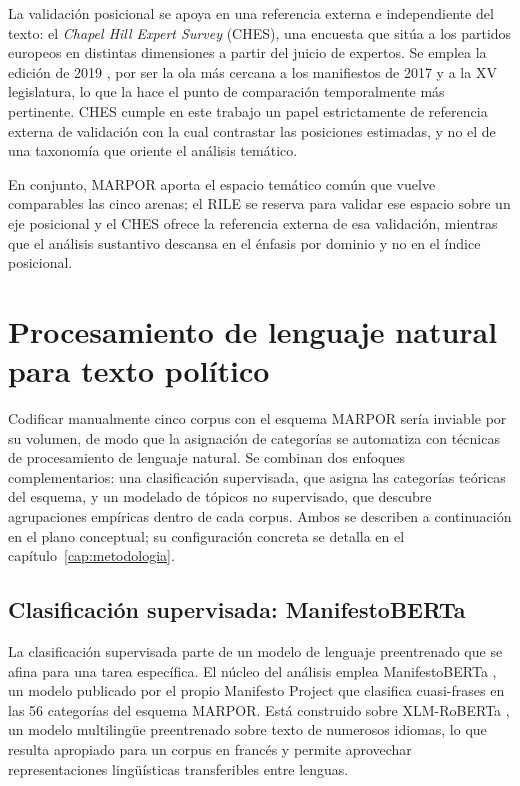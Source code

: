 La validación posicional se apoya en una referencia externa e independiente del
texto: el \emph{Chapel Hill Expert Survey} (CHES), una encuesta que sitúa a los
partidos europeos en distintas dimensiones a partir del juicio de expertos. Se
emplea la edición de 2019 \cite{jolly2022ches, ches2019data}, por ser la ola más
cercana a los manifiestos de 2017 y a la XV legislatura, lo que la hace el punto
de comparación temporalmente más pertinente. CHES cumple en este trabajo un papel
estrictamente de referencia externa de validación con la cual contrastar las
posiciones estimadas, y no el de una taxonomía que oriente el análisis temático.

En conjunto, MARPOR aporta el espacio temático común que vuelve comparables las
cinco arenas; el RILE se reserva para validar ese espacio sobre un eje posicional
y el CHES ofrece la referencia externa de esa validación, mientras que el análisis
sustantivo descansa en el énfasis por dominio y no en el índice posicional.

\section{Procesamiento de lenguaje natural para texto político}
\label{sec:nlp-politico}

Codificar manualmente cinco corpus con el esquema MARPOR sería inviable por su
volumen, de modo que la asignación de categorías se automatiza con técnicas de
procesamiento de lenguaje natural. Se combinan dos enfoques complementarios: una
clasificación supervisada, que asigna las categorías teóricas del esquema, y un
modelado de tópicos no supervisado, que descubre agrupaciones empíricas dentro de
cada corpus. Ambos se describen a continuación en el plano conceptual; su
configuración concreta se detalla en el capítulo~\ref{cap:metodologia}.

\subsection{Clasificación supervisada: ManifestoBERTa}
\label{sec:manifestoberta}

La clasificación supervisada parte de un modelo de lenguaje preentrenado que se
afina para una tarea específica. El núcleo del análisis emplea ManifestoBERTa
\cite{manifestoberta2024}, un modelo publicado por el propio Manifesto Project que
clasifica cuasi-frases en las 56 categorías del esquema MARPOR. Está construido
sobre XLM-RoBERTa \cite{conneau2020xlmr}, un modelo multilingüe preentrenado sobre
texto de numerosos idiomas, lo que resulta apropiado para un corpus en francés y
permite aprovechar representaciones lingüísticas transferibles entre lenguas.

